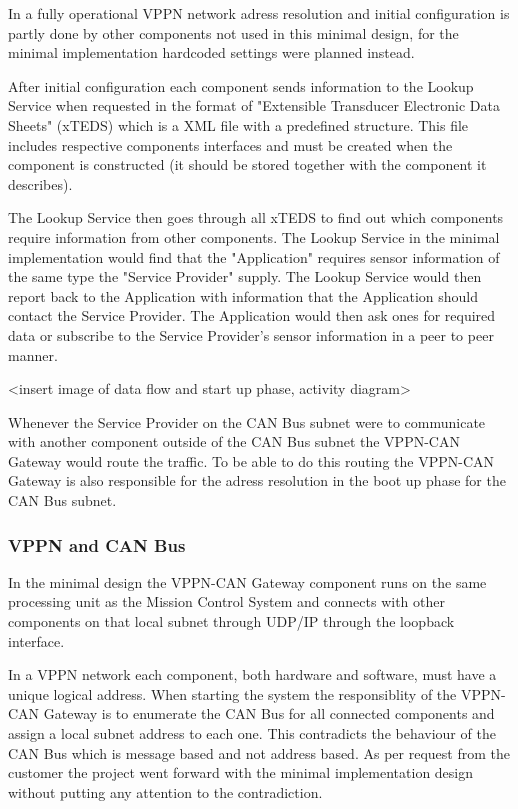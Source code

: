 In a fully operational VPPN network adress resolution and initial
configuration is partly done by other components not used in this minimal
design, for the minimal implementation hardcoded settings were planned instead.

After initial configuration each component sends information to the
Lookup Service when requested in the format of "Extensible Transducer Electronic Data Sheets"
(xTEDS) which is a XML file with a predefined structure. This file includes
respective components interfaces and must be created when the component is
constructed (it should be stored together with the component it describes).

The Lookup Service then goes through all xTEDS to find out which components
require information from other components. The Lookup Service in the minimal
implementation would find that the "Application" requires sensor information of
the same type the "Service Provider" supply. The Lookup Service would then report
back to the Application with information that the Application should contact
the Service Provider. The Application would then ask ones for required data or
subscribe to the Service Provider's sensor information in a peer to peer manner.

<insert image of data flow and start up phase, activity diagram>

Whenever the Service Provider on the CAN Bus subnet were to communicate
with another component outside of the CAN Bus subnet the VPPN-CAN Gateway
would route the traffic. To be able to do this routing the VPPN-CAN Gateway is also
responsible for the adress resolution in the boot up phase for the CAN Bus
subnet.

\subsubsection{VPPN and CAN Bus}\label{subsubsec:vppn_can_bus}
In the minimal design the VPPN-CAN Gateway component runs on the same
processing unit as the Mission Control System and connects with other
components on that local subnet through UDP/IP through the loopback interface.

In a VPPN network each component, both hardware and software, must have a unique
logical address. When starting the system the responsiblity of the VPPN-CAN Gateway is to
enumerate the CAN Bus for all connected components and assign a local subnet address to
each one. This contradicts the behaviour of the CAN Bus which is message based
and not address based. As per request from the customer the project went
forward with the minimal implementation design without putting any attention to
the contradiction.

